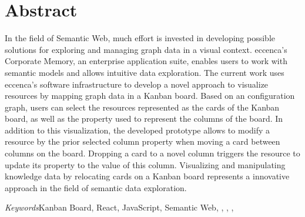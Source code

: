 \chapter*{Abstract}


\noindent In the field of Semantic Web, much effort is invested in developing possible solutions for exploring and managing graph data in a visual context. eccenca’s Corporate Memory, an enterprise application suite, enables users to work with semantic models and allows intuitive data exploration. The current work uses eccenca’s software infrastructure to develop a novel approach to visualize  resources by mapping graph data in a Kanban board. Based on an  configuration graph, users can select the resources represented as the cards of the Kanban board, as well as the property used to represent the columns of the board. In addition to this visualization, the developed prototype allows to modify a resource by the prior selected column property when moving a card between columns on the board. Dropping a card to a novel column triggers the resource to update its property to the value of this column. Visualizing and manipulating knowledge data by relocating cards on a Kanban board represents a innovative approach in the field of semantic data exploration.

\vspace{0.5cm}
{\textit{Keywords}\small\quad Kanban Board, React, JavaScript, Semantic Web, , , , }
